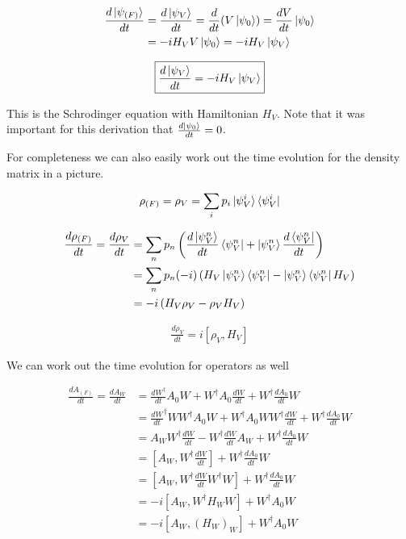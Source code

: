 \documentclass[12pt]{article}
\newcommand{\ddt}[1]{\frac{d #1}{dt}}
\begin{document}
\begin{align}
\ddt{\ket{\psi_{(F)}}} &= \ddt{\ket{\psi_V}} = \ddt{}(V\ket{\psi_0}) = \ddt{V} \ket{\psi_0}\\
&= -iH_V V\ket{\psi_0} = -i H_V \ket{\psi_V}
\end{align}

\begin{align}
\boxed{\ddt{\ket{\psi_V}} = -iH_V \ket{\psi_V}}
\end{align}

This is the Schrodinger equation with Hamiltonian $H_V$. Note that it was important for this derivation that $\ddt{\ket{\psi_0}}=0$.

For completeness we can also easily work out the time evolution for the density matrix in a picture.

\begin{align}
\rho_{(F)} = \rho_V = \sum_i p_i \ket{\psi_V^i}\bra{\psi_V^i}
\end{align}

\begin{align}
\ddt{\rho_{(F)}} = \ddt{\rho_V} &= \sum_n p_n \left(\ddt{\ket{\psi_V^n}}\bra{\psi_V^n} + \ket{\psi_V^n}\ddt{\bra{\psi_V^n}} \right)\\
&= \sum_n p_n (-i)\left(H_V \ket{\psi_V^n}\bra{\psi_V^n} - \ket{\psi_V^n}\bra{\psi_V^n}H_V \right)\\
&= -i\left(H_V \rho_V - \rho_V H_V\right)
\end{align}

\begin{align}
\boxed{\ddt{\rho_V} = i\left[\rho_V,H_V\right]}
\end{align}

We  can work out the time evolution for operators as well

\begin{align}
\ddt{A_{(F)}} = \ddt{A_W} &= \ddt{W^{\dag}} A_0 W + W^{\dag}A_0 \ddt{W} + W^{\dag} \ddt{A_0} W\\
&= \ddt{W}^{\dag} W W^{\dag} A_0 W + W^{\dag}A_0 W W^{\dag} \ddt{W} + W^{\dag}\ddt{A_0} W\\
&= A_W W^{\dag} \ddt{W} - W^{\dag}\ddt{W} A_W + W^{\dag}\ddt{A_0}W\\
&= \left[A_W, W^{\dag} \ddt{W}\right] + W^{\dag} \ddt{A_0} W\\
&= \left[A_W, W^{\dag} \ddt{W} W^{\dag} W\right] + W^{\dag} \ddt{A_0} W\\
&= -i\left[A_W, W^{\dag} H_W W\right] + W^{\dag} A_0 W\\
&= -i\left[A_W, (H_W)_W\right] + W^{\dag} A_0 W\\
\end{align}
\end{document}
